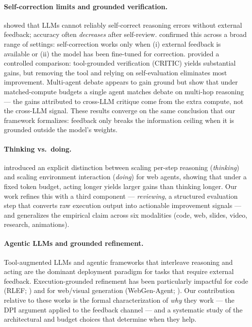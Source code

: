 \documentclass[11pt]{article}
\begin{document}
\paragraph{Self-correction limits and grounded verification.} \citet{huang2024selfcorrect} showed that LLMs cannot reliably self-correct reasoning errors without external feedback; accuracy often \emph{decreases} after self-review. \citet{kamoi2025correct} confirmed this across a broad range of settings: self-correction works only when (i) external feedback is available or (ii) the model has been fine-tuned for correction. \citet{gou2024critic} provided a controlled comparison: tool-grounded verification (CRITIC) yields substantial gains, but removing the tool and relying on self-evaluation eliminates most improvement. Multi-agent debate \citep{du2023multi} appears to gain ground but \citet{trankiela2026singleagent} show that under matched-compute budgets a single agent matches debate on multi-hop reasoning --- the gains attributed to cross-LLM critique come from the extra compute, not the cross-LLM signal. These results converge on the same conclusion that our framework formalizes: feedback only breaks the information ceiling when it is grounded outside the model's weights.

\paragraph{Thinking vs.\ doing.} \citet{shen2025thinking} introduced an explicit distinction between scaling per-step reasoning (\emph{thinking}) and scaling environment interaction (\emph{doing}) for web agents, showing that under a fixed token budget, acting longer yields larger gains than thinking longer. Our work refines this with a third component --- \emph{reviewing}, a structured evaluation step that converts raw execution output into actionable improvement signals --- and generalizes the empirical claim across six modalities (code, web, slides, video, research, animations).

\paragraph{Agentic LLMs and grounded refinement.} Tool-augmented LLMs \citep{schick2023toolformer,patil2024gorilla} and agentic frameworks that interleave reasoning and acting \citep{yao2023react,wang2023voyager} are the dominant deployment paradigm for tasks that require external feedback. Execution-grounded refinement has been particularly impactful for code (RLEF; \citealp{gehring2025rlef}) and for web/visual generation (WebGen-Agent; \citealp{webgen2025}). Our contribution relative to these works is the formal characterization of \emph{why} they work --- the DPI argument applied to the feedback channel --- and a systematic study of the architectural and budget choices that determine when they help.
\end{document}
